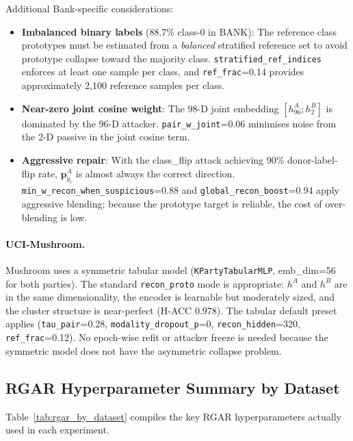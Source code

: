 \documentclass{article}
\begin{document}
Additional Bank-specific considerations:
\begin{itemize}
  \item \textbf{Imbalanced binary labels} (88.7\% class-0 in BANK):
    The reference class prototypes must be estimated from a \emph{balanced}
    stratified reference set to avoid prototype collapse toward the majority
    class.
    \texttt{stratified\_ref\_indices} enforces at least one sample per class,
    and \texttt{ref\_frac}=0.14 provides approximately 2,100 reference samples
    per class.

  \item \textbf{Near-zero joint cosine weight}: The 98-D joint embedding
    $[h^A_{96}; h^B_2]$ is dominated by the 96-D attacker.
    \texttt{pair\_w\_joint}=0.06 minimises noise from the 2-D passive in the
    joint cosine term.

  \item \textbf{Aggressive repair}: With the class_flip attack achieving 90\%
    donor-label-flip rate, $\mathbf{p}^A_{y_i}$ is almost always the correct
    direction.
    \texttt{min\_w\_recon\_when\_suspicious}=0.88 and
    \texttt{global\_recon\_boost}=0.94 apply aggressive blending;
    because the prototype target is reliable, the cost of over-blending is low.
\end{itemize}

\paragraph{UCI-Mushroom.}
Mushroom uses a symmetric tabular model (\texttt{KPartyTabularMLP},
emb\_dim=56 for both parties).
The standard \texttt{recon\_proto} mode is appropriate: $h^A$ and $h^B$ are
in the same dimensionality, the encoder is learnable but moderately sized,
and the cluster structure is near-perfect (H-ACC 0.978).
The tabular default preset applies (\texttt{tau\_pair}=0.28,
\texttt{modality\_dropout\_p}=0, \texttt{recon\_hidden}=320,
\texttt{ref\_frac}=0.12).
No epoch-wise refit or attacker freeze is needed because the symmetric model
does not have the asymmetric collapse problem.

\subsection{RGAR Hyperparameter Summary by Dataset}

Table~\ref{tab:rgar_by_dataset} compiles the key RGAR hyperparameters
actually used in each experiment.
\end{document}
